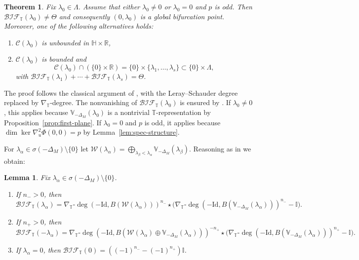 \documentclass[reqno,twoside,12pt]{amsart}
\newtheorem{Lemma}[Remark]{Lemma}
\newtheorem{Theorem}[Remark]{Theorem}
\newcommand{\bH}{\mathbb{H}}
\newcommand{\bI}{\mathbb{I}}
\newcommand{\bR}{\mathbb{R}}
\newcommand{\bT}{\mathbb{T}}
\newcommand{\bV}{\mathbb{V}}
\newcommand{\cC}{\mathcal{C}}
\newcommand{\cW}{\mathcal{W}}
\numberwithin{equation}{section} \errorcontextlines=0
\newcommand{\BIF}{\mathcal{BIF}}
\begin{document}
\begin{Theorem}\label{thm:AltRab}
Fix $\lambda_0\in\Lambda$. Assume that either $\lambda_0\neq 0$ or $\lambda_0=0$ and $p$ is odd. Then $\BIF_\bT(\lambda_0)\neq\Theta$ and consequently $(0,\lambda_0)$ is a global bifurcation point. Moreover, one of the following alternatives holds:
\begin{enumerate}
\item $\cC(\lambda_0)$ is unbounded in $\bH\times\bR$,
\item $\cC(\lambda_0)$ is bounded and
\[
\cC(\lambda_0)\cap(\{0\}\times\bR)=\{0\}\times\{\lambda_1,\dots,\lambda_s\}\subset\{0\}\times\Lambda,
\]
with $\BIF_\bT(\lambda_1)+\cdots+\BIF_\bT(\lambda_s)=\Theta$.
\end{enumerate}
\end{Theorem}

The proof follows the classical argument of \cite{Rabinowitz1971}, with the Leray--Schauder degree replaced by $\nabla_\bT$-degree. The nonvanishing of $\BIF_\bT(\lambda_0)$ is ensured by \cite[Theorem 4.5]{GarRyb}. If $\lambda_0\neq 0$, this applies because $\bV_{-\Delta_M}(\lambda_0)$ is a nontrivial $\bT$-representation by Proposition~\ref{prop:first-plane}. If $\lambda_0=0$ and $p$ is odd, it applies because $\dim\ker\nabla_u^2\Phi(0,0)=p$ by Lemma~\ref{lem:spec-structure}.


For $\lambda_\alpha\in\sigma(-\Delta_M)\setminus\{0\}$ let $\cW(\lambda_\alpha)=\bigoplus_{\lambda_\beta<\lambda_\alpha}\bV_{-\Delta_M}(\lambda_\beta)$. Reasoning as in \cite[Lemma 3.4]{GolSte2021} we obtain:

\begin{Lemma}\label{lem:indices}
Fix $\lambda_\alpha\in\sigma(-\Delta_M)\setminus\{0\}$.
\begin{enumerate}
\item If $n_->0$, then
\[
\BIF_\bT(\lambda_\alpha)=\nabla_\bT\text{-}\deg(-\mathrm{Id},B(\cW(\lambda_\alpha)))^{n_-}\star\bigl(\nabla_\bT\text{-}\deg(-\mathrm{Id},B(\bV_{-\Delta_M}(\lambda_\alpha)))^{n_-}-\bI\bigr).
\]
\item If $n_+>0$, then
\[
\BIF_\bT(-\lambda_\alpha)=\nabla_\bT\text{-}\deg(-\mathrm{Id},B(\cW(\lambda_\alpha)\oplus\bV_{-\Delta_M}(\lambda_\alpha)))^{-n_+}\star\bigl(\nabla_\bT\text{-}\deg(-\mathrm{Id},B(\bV_{-\Delta_M}(\lambda_\alpha)))^{n_+}-\bI\bigr).
\]
\item If $\lambda_\alpha=0$, then $\BIF_\bT(0)=((-1)^{n_-}-(-1)^{n_+})\bI$.
\end{enumerate}
\end{Lemma}
\end{document}
